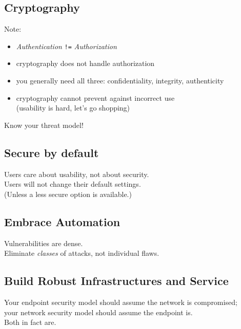 \documentclass[xga]{xdvislides}
\begin{document}
\subsection{Cryptography}
Note:
\begin{itemize}
	\item {\em Authentication} \verb+!=+ {\em Authorization}
	\item cryptography does not handle authorization
	\item you generally need all three: confidentiality, integrity, authenticity
	\item cryptography cannot prevent against incorrect use \\
		(usability is hard, let's go shopping)
\end{itemize}
\addvspace{.5in}
Know your threat model!

\subsection{Secure by default}
\vspace{.5in}
\Huge
\begin{center}
Users care about usability, not about security. \\
\addvspace{.5in}
Users will not change their default settings. \\
\Normalsize
(Unless a less secure option is available.)
\end{center}

\subsection{Embrace Automation}
\vspace*{\fill}
\Huge
\begin{center}
	Vulnerabilities are dense. \\
\addvspace{.5in}
	Eliminate {\em classes} of attacks, not
	individual flaws. \\
\end{center}
\Normalsize
\vspace*{\fill}

\subsection{Build Robust Infrastructures and Service}
\vspace*{\fill}
\Huge
\begin{center}
	Your endpoint security model should assume the
	network is compromised; \\
	your network security model should assume the
	endpoint is. \\
\addvspace{.5in}
	Both in fact are.
\end{center}
\Normalsize
\vspace*{\fill}
\end{document}

